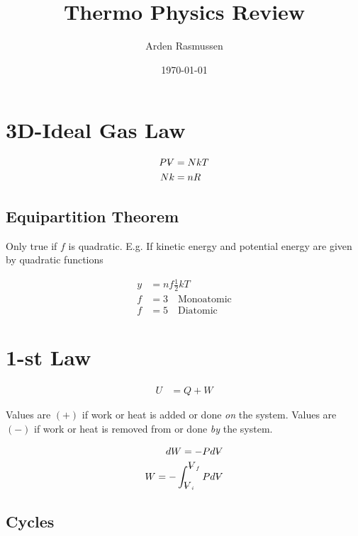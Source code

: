\documentclass[10pt]{article}
\title{Thermo Physics Review}
\date{\today}
\author{Arden Rasmussen}
\newcommand{\V}{{\ooalign{\hfil$V$\hfil\cr\kern0.08em--\hfil\cr}}}
\begin{document}
\maketitle
\newpage
\tableofcontents
\newpage
{}

\section{3D-Ideal Gas Law}%
\label{sec:3d_ideal_gas_law}

\begin{align}
  P\V&=NkT\\
  Nk&=nR
\end{align}

\subsection{Equipartition Theorem}%
\label{sub:equipartition_theorem}

Only true if $f$ is quadratic. E.g. If kinetic energy and potential energy are
given by quadratic functions

\begin{align}
  y&=nf\frac{1}{2}kT\\
  f&=3\quad\text{Monoatomic}\\
  f&=5\quad\text{Diatomic}
\end{align}

\section{1-st Law}%
\label{sec:1_st_law}

\begin{align}
  U&=Q+W
\end{align}

Values are $(+)$ if work or heat is added or done \textit{on}  the system.
Values are $(-)$ if work or heat is removed from or done \textit{by}  the
system.

\begin{align}
  dW=-Pd\V\\
  W=-\int_{\V_i}^{\V_f}Pd\V
\end{align}

\subsection{Cycles}%
\label{sub:cycles}
\end{document}
